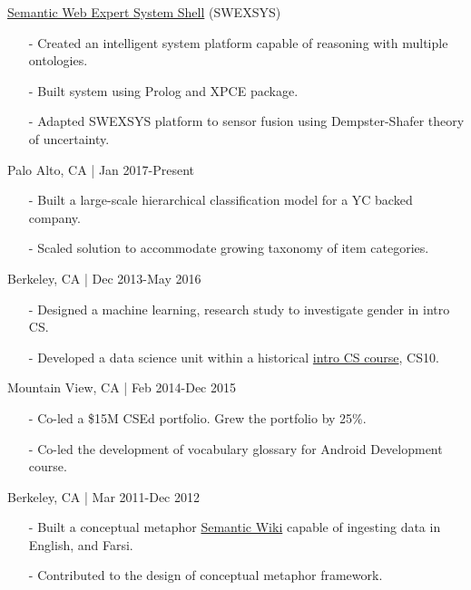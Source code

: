 \documentclass[11pt,article,oneside]{memoir}
\begin{document}
\ind \href{https://github.com/omoju/SWEXSYS}{Semantic Web Expert System Shell} (SWEXSYS)
\begin{itemize}[noitemsep,nolistsep]
\item[-] Created an intelligent system platform capable of reasoning with multiple ontologies.
\item[-] Built system using Prolog and XPCE package.
\item[-] Adapted SWEXSYS platform to sensor fusion using Dempster-Shafer theory of uncertainty.
\end{itemize}

\bigskip

\medskip

 \hfill Palo Alto, CA | Jan 2017-Present
\begin{itemize}[nolistsep]
\item[-] Built a large-scale hierarchical classification model for a YC backed company.
\item[-] Scaled solution to accommodate growing taxonomy of item categories.
\end{itemize} 

 \hfill Berkeley, CA | Dec 2013-May 2016
\begin{itemize}[noitemsep,nolistsep]
\item[-] Designed a machine learning, research study to investigate gender in intro CS.
\item[-] Developed a data science unit within a historical \href{http://www.whitehouse.gov/the-press-office/2014/12/08/fact-sheet-new-commitments-support-computer-science-education}{intro CS course}, CS10.
\end{itemize}

 \hfill Mountain View, CA | Feb 2014-Dec 2015
\begin{itemize}[nolistsep]
\item[-]Co-led a \$15M CSEd portfolio. Grew the portfolio by 25\%.
\item[-]Co-led the development of vocabulary glossary for Android Development course.
\end{itemize} 

 \hfill Berkeley, CA | Mar 2011-Dec 2012
\begin{itemize}[nolistsep]
\item[-] Built a conceptual metaphor \href{http://metaphor.icsi.berkeley.edu}{Semantic Wiki} capable of ingesting data in English, and Farsi.
\item[-] Contributed to the design of conceptual metaphor framework.
\end{itemize} 
\end{document}
